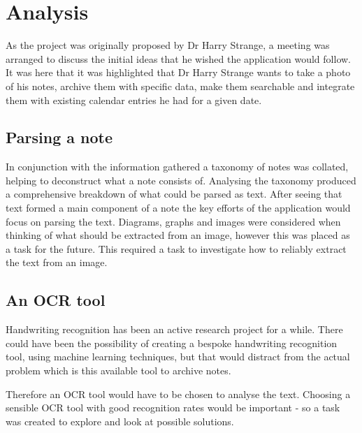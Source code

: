 \section{Analysis}

As the project was originally proposed by Dr Harry Strange, a meeting was arranged to discuss the initial ideas that he wished the application would follow. It was here that it was highlighted that Dr Harry Strange wants to take a photo of his notes, archive them with specific data, make them searchable and integrate them with existing calendar entries he had for a given date.

\subsection{Parsing a note}
In conjunction with the information gathered a taxonomy of notes was collated, helping to deconstruct what a note consists of. Analysing the taxonomy produced a comprehensive breakdown of what could be parsed as text. After seeing that text formed a main component of a note the key efforts of the application would focus on parsing the text. Diagrams, graphs and images were considered when thinking of what should be extracted from an image, however this was placed as a task for the future. This required a task to investigate how to reliably extract the text from an image.

\subsection{An OCR tool}
Handwriting recognition has been an active research project for a while. There could have been the possibility of creating a bespoke handwriting recognition tool, using machine learning techniques, but that would distract from the actual problem which is this available tool to archive notes.

Therefore an OCR tool would have to be chosen to analyse the text. Choosing a sensible OCR tool with good recognition rates would be important - so a task was created to explore and look at possible solutions.

